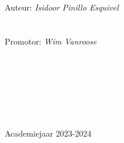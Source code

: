 \begin{titlepage}
\begin{center}
        \ \\
        \normalsize
        Auteur: {\em Isidoor Pinillo Esquivel}\\
        \ \\
        \ \\
        Promotor: {\em Wim Vanroose}\\
        \ \\
        \ \\
        \ \\
        \ \\
        \ \\
        \ \\
        \ \\
        A{\sc cademiejaar 2023-2024}

    \end{center}
\end{titlepage}


